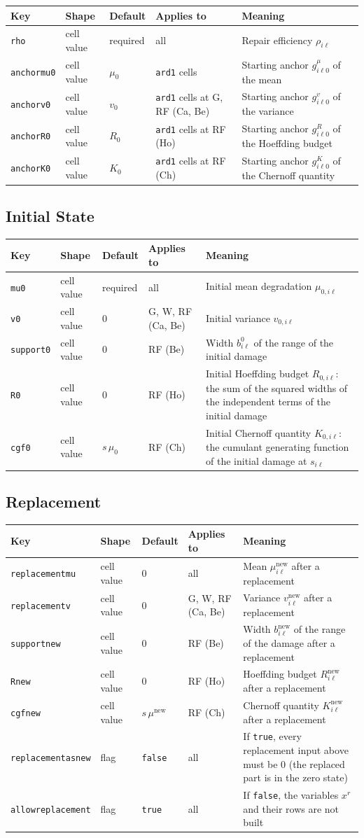 \documentclass[11pt,a4paper]{article}
\makeatletter
\theoremstyle{plain}
\theoremstyle{definition}
\newcommand{\new}{\mathrm{new}}
\renewcommand{\_}{\textunderscore\allowbreak{}}
\providecommand{\keyrow}[5]{{\raggedright #1\par} & {\raggedright #2\par} & {\raggedright #3\par} & {\raggedright #4\par} & {\raggedright #5\par} \\}
\providecommand{\tabstart}[2]{\begingroup\small\begin{longtable}{@{}#1@{}}\toprule #2 \\ \midrule \endhead}
\providecommand{\tabend}{\bottomrule\end{longtable}\endgroup}
\providecommand{\keytab}{\tabstart{p{3.2cm}p{2.2cm}p{1.8cm}p{1.9cm}p{4.5cm}}{Key & Shape & Default & Applies to & Meaning}}
\makeatother
\begin{document}
\keytab
\keyrow{\texttt{rho}}{cell value}{required}{all}{Repair efficiency $\rho_{i\ell}$}
\keyrow{\texttt{anchor\_mu\_0}}{cell value}{$\mu_0$}{\texttt{ard1} cells}{Starting anchor $g^{\mu}_{i\ell 0}$ of the mean}
\keyrow{\texttt{anchor\_v\_0}}{cell value}{$v_0$}{\texttt{ard1} cells at G, RF (Ca, Be)}{Starting anchor $g^{v}_{i\ell 0}$ of the variance}
\keyrow{\texttt{anchor\_R\_0}}{cell value}{$R_0$}{\texttt{ard1} cells at RF (Ho)}{Starting anchor $g^{R}_{i\ell 0}$ of the Hoeffding budget}
\keyrow{\texttt{anchor\_K\_0}}{cell value}{$K_0$}{\texttt{ard1} cells at RF (Ch)}{Starting anchor $g^{K}_{i\ell 0}$ of the Chernoff quantity}
\tabend

\subsection{Initial State}\label{sec:input_initial}

\keytab
\keyrow{\texttt{mu\_0}}{cell value}{required}{all}{Initial mean degradation $\mu_{0,i\ell}$}
\keyrow{\texttt{v\_0}}{cell value}{$0$}{G, W, RF (Ca, Be)}{Initial variance $v_{0,i\ell}$}
\keyrow{\texttt{support\_0}}{cell value}{$0$}{RF (Be)}{Width $b^{0}_{i\ell}$ of the range of the initial damage}
\keyrow{\texttt{R\_0}}{cell value}{$0$}{RF (Ho)}{Initial Hoeffding budget $R_{0,i\ell}$: the sum of the squared widths of the independent terms of the initial damage}
\keyrow{\texttt{cgf\_0}}{cell value}{$s\,\mu_0$}{RF (Ch)}{Initial Chernoff quantity $K_{0,i\ell}$: the cumulant generating function of the initial damage at $s_{i\ell}$}
\tabend

\subsection{Replacement}\label{sec:input_replacement}

\keytab
\keyrow{\texttt{replacement\_mu}}{cell value}{$0$}{all}{Mean $\mu^{\new}_{i\ell}$ after a replacement}
\keyrow{\texttt{replacement\_v}}{cell value}{$0$}{G, W, RF (Ca, Be)}{Variance $v^{\new}_{i\ell}$ after a replacement}
\keyrow{\texttt{support\_new}}{cell value}{$0$}{RF (Be)}{Width $b^{\new}_{i\ell}$ of the range of the damage after a replacement}
\keyrow{\texttt{R\_new}}{cell value}{$0$}{RF (Ho)}{Hoeffding budget $R^{\new}_{i\ell}$ after a replacement}
\keyrow{\texttt{cgf\_new}}{cell value}{$s\,\mu^{\new}$}{RF (Ch)}{Chernoff quantity $K^{\new}_{i\ell}$ after a replacement}
\keyrow{\texttt{replacement\_as\_new}}{flag}{\texttt{false}}{all}{If \texttt{true}, every replacement input above must be $0$ (the replaced part is in the zero state)}
\keyrow{\texttt{allow\_replacement}}{flag}{\texttt{true}}{all}{If \texttt{false}, the variables $x^r$ and their rows are not built}
\tabend
\end{document}
